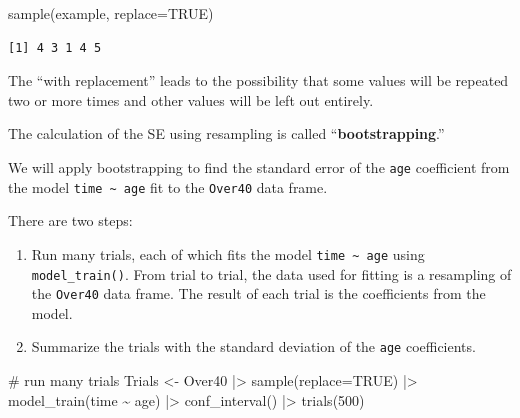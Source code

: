 \documentclass[
  letterpaper,
  DIV=11,
  numbers=noendperiod,
  oneside]{scrartcl}
\newenvironment{Shaded}{\begin{snugshade}}{\end{snugshade}}
\newcommand{\AttributeTok}[1]{\textcolor[rgb]{0.40,0.45,0.13}{#1}}
\newcommand{\CommentTok}[1]{\textcolor[rgb]{0.37,0.37,0.37}{#1}}
\newcommand{\ConstantTok}[1]{\textcolor[rgb]{0.56,0.35,0.01}{#1}}
\newcommand{\DecValTok}[1]{\textcolor[rgb]{0.68,0.00,0.00}{#1}}
\newcommand{\FunctionTok}[1]{\textcolor[rgb]{0.28,0.35,0.67}{#1}}
\newcommand{\NormalTok}[1]{\textcolor[rgb]{0.00,0.23,0.31}{#1}}
\newcommand{\OtherTok}[1]{\textcolor[rgb]{0.00,0.23,0.31}{#1}}
\newcommand{\SpecialCharTok}[1]{\textcolor[rgb]{0.37,0.37,0.37}{#1}}
\begin{document}
\begin{Shaded}
\begin{Highlighting}[]
\FunctionTok{sample}\NormalTok{(example, }\AttributeTok{replace=}\ConstantTok{TRUE}\NormalTok{)}
\end{Highlighting}
\end{Shaded}

\begin{verbatim}
[1] 4 3 1 4 5
\end{verbatim}

The ``with replacement'' leads to the possibility that some values will
be repeated two or more times and other values will be left out
entirely.

The calculation of the SE using resampling is called
``\textbf{bootstrapping}.''

\begin{tcolorbox}[enhanced jigsaw, colbacktitle=quarto-callout-warning-color!10!white, opacityback=0, breakable, opacitybacktitle=0.6, colback=white, coltitle=black, arc=.35mm, title=\textcolor{quarto-callout-warning-color}{\faExclamationTriangle}\hspace{0.5em}{Demonstration: Bootstrapping the standard error}, left=2mm, colframe=quarto-callout-warning-color-frame, rightrule=.15mm, bottomrule=.15mm, leftrule=.75mm, bottomtitle=1mm, toptitle=1mm, titlerule=0mm, toprule=.15mm]

We will apply bootstrapping to find the standard error of the
\texttt{age} coefficient from the model
\texttt{time\ \textasciitilde{}\ age} fit to the \texttt{Over40} data
frame.

There are two steps:

\begin{enumerate}
\def\labelenumi{\arabic{enumi}.}
\item
  Run many trials, each of which fits the model
  \texttt{time\ \textasciitilde{}\ age} using \texttt{model\_train()}.
  From trial to trial, the data used for fitting is a resampling of the
  \texttt{Over40} data frame. The result of each trial is the
  coefficients from the model.
\item
  Summarize the trials with the standard deviation of the \texttt{age}
  coefficients.
\end{enumerate}

\begin{Shaded}
\begin{Highlighting}[]
\CommentTok{\# run many trials}
\NormalTok{Trials }\OtherTok{\textless{}{-}} 
\NormalTok{  Over40 }\SpecialCharTok{|\textgreater{}} \FunctionTok{sample}\NormalTok{(}\AttributeTok{replace=}\ConstantTok{TRUE}\NormalTok{) }\SpecialCharTok{|\textgreater{}}
  \FunctionTok{model\_train}\NormalTok{(time }\SpecialCharTok{\textasciitilde{}}\NormalTok{ age) }\SpecialCharTok{|\textgreater{}}
  \FunctionTok{conf\_interval}\NormalTok{() }\SpecialCharTok{|\textgreater{}}
  \FunctionTok{trials}\NormalTok{(}\DecValTok{500}\NormalTok{)}


\end{Highlighting}
\end{Shaded}
\end{tcolorbox}
\end{document}
